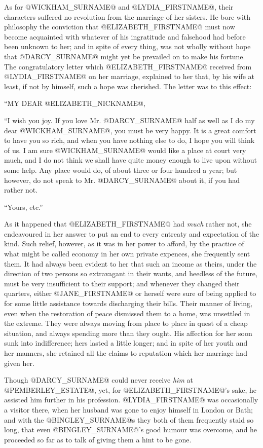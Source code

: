 As for @WICKHAM_SURNAME@ and @LYDIA_FIRSTNAME@, their characters suffered no revolution from
the marriage of her sisters. He bore with philosophy the conviction that
@ELIZABETH_FIRSTNAME@ must now become acquainted with whatever of his ingratitude
and falsehood had before been unknown to her; and in spite of every
thing, was not wholly without hope that @DARCY_SURNAME@ might yet be prevailed on
to make his fortune. The congratulatory letter which @ELIZABETH_FIRSTNAME@ received
from @LYDIA_FIRSTNAME@ on her marriage, explained to her that, by his wife at least,
if not by himself, such a hope was cherished. The letter was to this
effect:

``MY DEAR @ELIZABETH_NICKNAME@,

``I wish you joy. If you love Mr. @DARCY_SURNAME@ half as well as I do my dear
@WICKHAM_SURNAME@, you must be very happy. It is a great comfort to have you so
rich, and when you have nothing else to do, I hope you will think of us.
I am sure @WICKHAM_SURNAME@ would like a place at court very much, and I do not
think we shall have quite money enough to live upon without some help.
Any place would do, of about three or four hundred a year; but however,
do not speak to Mr. @DARCY_SURNAME@ about it, if you had rather not.

``Yours, etc.''

As it happened that @ELIZABETH_FIRSTNAME@ had \textit{much} rather not, she endeavoured in
her answer to put an end to every entreaty and expectation of the kind.
Such relief, however, as it was in her power to afford, by the practice
of what might be called economy in her own private expences, she
frequently sent them. It had always been evident to her that such an
income as theirs, under the direction of two persons so extravagant in
their wants, and heedless of the future, must be very insufficient to
their support; and whenever they changed their quarters, either @JANE_FIRSTNAME@ or
herself were sure of being applied to for some little assistance
towards discharging their bills. Their manner of living, even when the
restoration of peace dismissed them to a home, was unsettled in the
extreme. They were always moving from place to place in quest of a cheap
situation, and always spending more than they ought. His affection for
her soon sunk into indifference; hers lasted a little longer; and
in spite of her youth and her manners, she retained all the claims to
reputation which her marriage had given her.

Though @DARCY_SURNAME@ could never receive \textit{him} at @PEMBERLEY_ESTATE@, yet, for
@ELIZABETH_FIRSTNAME@'s sake, he assisted him further in his profession. @LYDIA_FIRSTNAME@ was
occasionally a visitor there, when her husband was gone to enjoy himself
in London or Bath; and with the @BINGLEY_SURNAME@s they both of them frequently
staid so long, that even @BINGLEY_SURNAME@'s good humour was overcome, and he
proceeded so far as to talk of giving them a hint to be gone.

